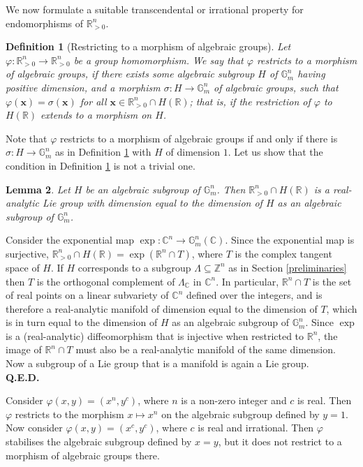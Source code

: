 \documentclass[9pt]{amsart}
\theoremstyle{my_theorem_style}
\newtheorem{definition}{Definition}
\numberwithin{definition}{section}
\newtheorem{lemma}[definition]{Lemma}
\renewenvironment{proof}{\noindent {\textbf{Proof.}}}{\\\textbf{Q.E.D.}}
\newcommand{\C}{\mathbb{C}}
\newcommand{\G}{\mathbb{G}}
\renewcommand{\phi}{\varphi}
\newcommand{\R}{\mathbb{R}}
\renewcommand{\vec}[1]{\bm{#1}}
\newcommand{\Z}{\mathbb{Z}}
\begin{document}
We now formulate a suitable transcendental or irrational property for endomorphisms of $\R_{>0}^n$.

\begin{definition}
    [Restricting to a morphism of algebraic groups]
    \label{restricting_to_a_morphism_of_algebraic_groups}
    Let $\phi : \R_{>0}^n \to \R_{>0}^n$ be a group homomorphism. We say that $\phi$ restricts to a morphism of algebraic groups, if there exists some algebraic subgroup $H$ of $\G_m^n$ having positive dimension, and a morphism $\sigma : H \to \G_m^n$ of algebraic groups, such that $\phi(\vec{x}) = \sigma(\vec{x})$ for all $\vec{x} \in \R^n_{>0} \cap H(\R)$; that is, if the restriction of $\phi$ to $H(\R)$ extends to a morphism on $H$.
\end{definition}

Note that $\phi$ restricts to a morphism of algebraic groups if and only if there is $\sigma : H \to \G_m^n$ as in Definition \ref{restricting_to_a_morphism_of_algebraic_groups} with $H$ of dimension $1$. Let us show that the condition in Definition \ref{restricting_to_a_morphism_of_algebraic_groups} is not a trivial one.

\begin{lemma}
    Let $H$ be an algebraic subgroup of $\G_m^n$. Then $\R_{>0}^n \cap H(\R)$ is a real-analytic Lie group with dimension equal to the dimension of $H$ as an algebraic subgroup of $\G_m^n$.
\end{lemma}
\begin{proof}
    Consider the exponential map $\exp : \C^n \to \G_m^n(\C)$. Since the exponential map is surjective, $\R_{>0}^n \cap H(\R) = \exp(\R^n \cap T)$, where $T$ is the complex tangent space of $H$. If $H$ corresponds to a subgroup $\Lambda \subseteq \Z^n$ as in Section \ref{preliminaries} then $T$ is the orthogonal complement of $\Lambda_\C$ in $\C^n$. In particular, $\R^n \cap T$ is the set of real points on a linear subvariety of $\C^n$ defined over the integers, and is therefore a real-analytic manifold of dimension equal to the dimension of $T$, which is in turn equal to the dimension of $H$ as an algebraic subgroup of $\G_m^n$. Since $\exp$ is a (real-analytic) diffeomorphism that is injective when restricted to $\R^n$, the image of $\R^n \cap T$ must also be a real-analytic manifold of the same dimension. Now a subgroup of a Lie group that is a manifold is again a Lie group.
\end{proof}

Consider $\phi(x, y) = (x^n, y^c)$, where $n$ is a non-zero integer and $c$ is real. Then $\phi$ restricts to the morphism $x \mapsto x^n$ on the algebraic subgroup defined by $y = 1$. Now consider $\phi(x, y) = (x^c, y^c)$, where $c$ is real and irrational. Then $\phi$ stabilises the algebraic subgroup defined by $x = y$, but it does not restrict to a morphism of algebraic groups there.
\end{document}
